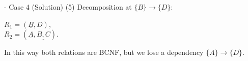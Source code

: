\begin{frame}[fragile]{ - Case 4 (Solution)}
	(5) Decomposition at $\{B\} \rightarrow \{D\}$:\\\vspace{5pt}
	
	$R_1 = (\underline{B}, D),$\\
	$R_2 = (\underline{A}, \underline{B, C}).$\\\vspace{5pt}
	
	In this way both relations are BCNF, but we lose a dependency $\{A\} \rightarrow \{D\}$.\\\vspace{5pt}
	
\end{frame}
